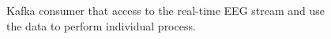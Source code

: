\begin{figure}
\begin{centering}

\par\end{centering}
\caption[kafka consumer]{Kafka consumer that access to the real-time EEG stream and use the data to perform individual process.}
\label{fig:transformer}
\end{figure}